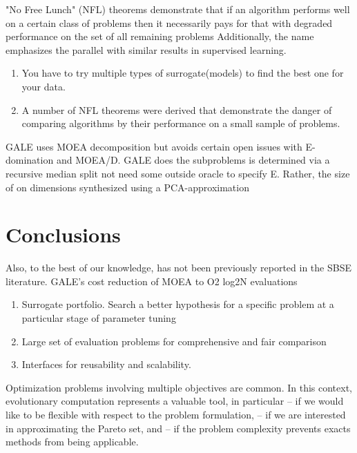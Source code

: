         "No Free Lunch" (NFL) theorems demonstrate that if an algorithm performs well on a certain class of problems then it necessarily pays for that with degraded performance on the set of 
        all remaining problems Additionally, the name emphasizes the parallel with similar results in supervised learning.
        \begin{enumerate}
            \item You have to try multiple types of surrogate(models) to find the best one for your data.
            \item A number of NFL theorems were derived that demonstrate the danger of comparing algorithms by their performance on a small sample of problems.
        \end{enumerate}

        GALE uses MOEA decomposition but avoids certain open issues with E-domination and MOEA/D. 
        GALE does the subproblems is determined via a recursive median split not need some outside oracle to specify E. 
        Rather, the size of on dimensions synthesized using a PCA-approximation


    \section{Conclusions}

        Also, to the best of our knowledge, has not been previously reported in the SBSE literature. GALE’s cost reduction of MOEA to O2 log2N evaluations
        
        \begin{enumerate}
            \item Surrogate portfolio. Search a better hypothesis for a specific problem at a particular stage of parameter tuning
            \item Large set of evaluation problems for comprehensive and fair comparison
            \item Interfaces for reusability and scalability. 
        \end{enumerate}


        Optimization problems involving multiple objectives are common. In this context, evolutionary computation represents a valuable tool, in particular 
        – if we would like to be flexible with respect to the problem formulation, 
        – if we are interested in approximating the Pareto set, and 
        – if the problem complexity prevents exacts methods from being applicable.

